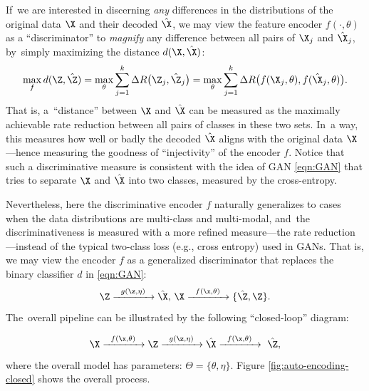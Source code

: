 \documentclass[../../book-main.tex]{subfiles}
\begin{document}
{If~we are interested in discerning {\em any} differences in the distributions of the original data $\X$ and their decoded $\hat \X$, we may view the feature encoder $f(\cdot, \theta)$ as a ``discriminator'' to {\em magnify} any difference between all pairs of $\X_j$ and $\hat \X_j$, by~simply maximizing the distance $d(\X, \hat \X)$:
\begin{equation}
\max_f d(\Z, \hat \Z) = \max_{\theta} \sum_{j=1}^k \Delta R\big(\Z_j, \hat{\Z}_j\big) = \max_{\theta} \sum_{j=1}^k \Delta R\big(f(\X_j,\theta), f(\hat{\X}_j,\theta)\big).
    \label{eqn:max-distance}
\end{equation}
That is, a~``distance'' between $\X$ and $\hat \X$ can be measured as the maximally achievable rate reduction between all pairs of classes in these two sets. In~a way, this measures how well or badly the decoded $\hat \X$ aligns with the original data $\X$---hence measuring the goodness of ``injectivity'' of the encoder $f$. Notice that such a discriminative measure is consistent with the idea of GAN \eqref{eqn:GAN} that tries to separate $\X$ and $\hat \X$ into two classes, measured by the cross-entropy. 

Nevertheless, here the  discriminative encoder $f$ naturally generalizes to cases when the data distributions are multi-class and multi-modal, and~the discriminativeness is measured with a more refined measure---the rate reduction---instead of the typical two-class loss (e.g., cross entropy) used in GANs. That is, we may view the encoder $f$ as a generalized discriminator that replaces the binary classifier $d$ in \eqref{eqn:GAN}:
\begin{equation}
 \Z \xrightarrow{\hspace{2mm} g(\z,\eta) \hspace{2mm}} \hat \X, \, \X \xrightarrow{\hspace{2mm} f(\x, \theta)\hspace{2mm}} \{\hat \Z, \Z\}.
 \label{eqn:closed-loop-GAN}
\end{equation}
The~overall pipeline can be illustrated by the following ``closed-loop''  diagram:}
\begin{equation}
    \X \xrightarrow{\hspace{2mm} f(\x, \theta)\hspace{2mm}} \Z \xrightarrow{\hspace{2mm} g(\z,\eta) \hspace{2mm}} \hat \X \xrightarrow{\hspace{2mm} f(\x, \theta)\hspace{2mm}} \ \hat \Z, 
\end{equation}
where the overall model has parameters: $\Theta = \{\theta, \eta\}$. Figure \ref{fig:auto-encoding-closed} shows the overall process.  
\end{document}
